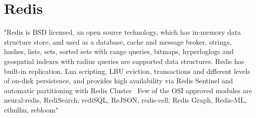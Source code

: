 \section{Redis}

"Redis is BSD licensed, an open source technology, which has in-memory data structure store, and
used as a database, cache and message broker. strings, hashes, lists, sets, sorted sets with 
range queries, bitmaps, hyperloglogs and geospatial indexes with radius queries are supported
data structures. Redis has built-in replication, Lua scripting, LRU eviction, transactions and
different levels of on-disk persistence, and provides high availability via Redis Sentinel and
automatic partitioning with Redis Cluster~\cite{hid-sp18-520-Redis}
Few of the OSI approved modules are neural-redis, RediSearch, rediSQL, ReJSON, redis-cell, 
Redis Graph, Redis-ML, cthulhu, rebloom"~\cite{hid-sp18-520-Redis-Modules}
